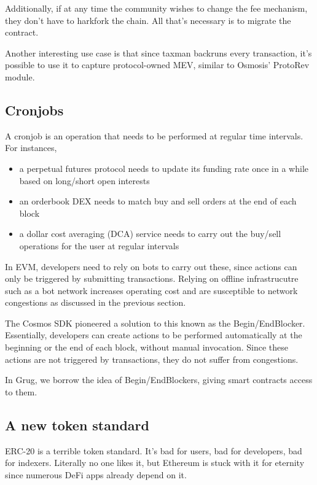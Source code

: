 \documentclass{article}
\begin{document}
Additionally, if at any time the community wishes to change the fee mechanism, they don't have to harkfork the chain. All that's necessary is to migrate the contract.

Another interesting use case is that since taxman backruns every transaction, it's possible to use it to capture protocol-owned MEV, similar to Osmosis' ProtoRev\supercite{protorev} module.

\subsection{Cronjobs}

A cronjob is an operation that needs to be performed at regular time intervals. For instances,

\begin{itemize}
  \item a perpetual futures protocol needs to update its funding rate once in a while based on long/short open interests
  \item an orderbook DEX needs to match buy and sell orders at the end of each block
  \item a dollar cost averaging (DCA) service needs to carry out the buy/sell operations for the user at regular intervals
\end{itemize}

In EVM, developers need to rely on bots to carry out these, since actions can only be triggered by submitting transactions. Relying on offline infrastrucutre such as a bot network increases operating cost and are susceptible to network congestions as discussed in the previous section.

The Cosmos SDK pioneered a solution to this known as the Begin/EndBlocker. Essentially, developers can create actions to be performed automatically at the beginning or the end of each block, without manual invocation. Since these actions are not triggered by transactions, they do not suffer from congestions.

In Grug, we borrow the idea of Begin/EndBlockers,\supercite{beginendblocker} giving smart contracts access to them.

\subsection{A new token standard}

ERC-20 is a terrible token standard. It's bad for users, bad for developers, bad for indexers. Literally no one likes it, but Ethereum is stuck with it for eternity since numerous DeFi apps already depend on it.
\end{document}
